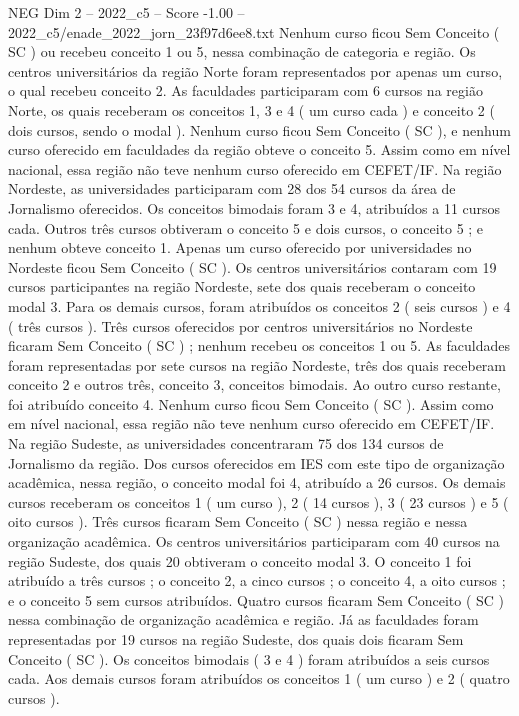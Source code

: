\begin{textsample}{NEG Dim 2 – 2022\_c5 – Score -1.00 – 2022\_c5/enade\_2022\_jorn\_23f97d6ee8.txt}
Nenhum curso ficou Sem Conceito ( SC ) ou recebeu conceito 1 ou 5, nessa combinação de categoria e região.
Os centros universitários da região Norte foram representados por apenas um curso, o qual recebeu conceito 2.
As faculdades participaram com 6 cursos na região Norte, os quais receberam os conceitos 1, 3 e 4 ( um curso cada ) e conceito 2 ( dois cursos, sendo o modal ).
Nenhum curso ficou Sem Conceito ( SC ), e nenhum curso oferecido em faculdades da região obteve o conceito 5.
Assim como em nível nacional, essa região não teve nenhum curso oferecido em CEFET/IF.
Na região Nordeste, as universidades participaram com 28 dos 54 cursos da área de Jornalismo oferecidos.
Os conceitos bimodais foram 3 e 4, atribuídos a 11 cursos cada.
Outros três cursos obtiveram o conceito 5 e dois cursos, o conceito 5 ; e nenhum obteve conceito 1.
Apenas um curso oferecido por universidades no Nordeste ficou Sem Conceito ( SC ).
Os centros universitários contaram com 19 cursos participantes na região Nordeste, sete dos quais receberam o conceito modal 3.
Para os demais cursos, foram atribuídos os conceitos 2 ( seis cursos ) e 4 ( três cursos ).
Três cursos oferecidos por centros universitários no Nordeste ficaram Sem Conceito ( SC ) ; nenhum recebeu os conceitos 1 ou 5.
As faculdades foram representadas por sete cursos na região Nordeste, três dos quais receberam conceito 2 e outros três, conceito 3, conceitos bimodais.
Ao outro curso restante, foi atribuído conceito 4.
Nenhum curso ficou Sem Conceito ( SC ).
Assim como em nível nacional, essa região não teve nenhum curso oferecido em CEFET/IF.
Na região Sudeste, as universidades concentraram 75 dos 134 cursos de Jornalismo da região.
Dos cursos oferecidos em IES com este tipo de organização acadêmica, nessa região, o conceito modal foi 4, atribuído a 26 cursos.
Os demais cursos receberam os conceitos 1 ( um curso ), 2 ( 14 cursos ), 3 ( 23 cursos ) e 5 ( oito cursos ).
Três cursos ficaram Sem Conceito ( SC ) nessa região e nessa organização acadêmica.
Os centros universitários participaram com 40 cursos na região Sudeste, dos quais 20 obtiveram o conceito modal 3.
O conceito 1 foi atribuído a três cursos ; o conceito 2, a cinco cursos ; o conceito 4, a oito cursos ; e o conceito 5 sem cursos atribuídos.
Quatro cursos ficaram Sem Conceito ( SC ) nessa combinação de organização acadêmica e região.
Já as faculdades foram representadas por 19 cursos na região Sudeste, dos quais dois ficaram Sem Conceito ( SC ).
Os conceitos bimodais ( 3 e 4 ) foram atribuídos a seis cursos cada.
Aos demais cursos foram atribuídos os conceitos 1 ( um curso ) e 2 ( quatro cursos ).

\end{textsample}
